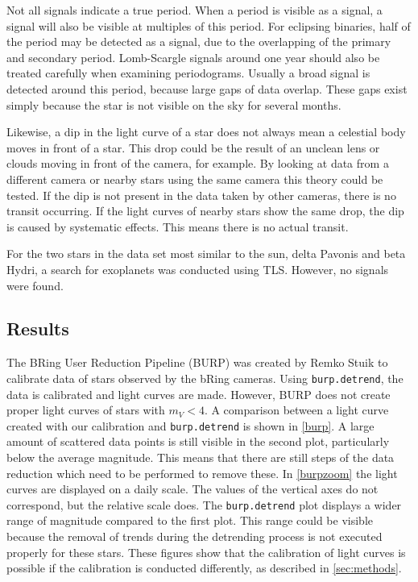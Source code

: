 \documentclass[onecolumn]{aa} %
\begin{document}
Not all signals indicate a true period.
When a period is visible as a signal, a signal will also be visible at multiples of this period. For eclipsing binaries, half of the period may be detected as a signal, due to the overlapping of the primary and secondary period.
%
Lomb-Scargle signals around one year should also be treated carefully when examining periodograms. Usually a broad signal is detected around this period, because large gaps of data overlap. These gaps exist simply because the star is not visible on the sky for several months.

Likewise, a dip in the light curve of a star does not always mean a celestial body moves in front of a star. This drop could be the result of an unclean lens or clouds moving in front of the camera, for example. By looking at data from a different camera or nearby stars using the same camera this theory could be tested. If the dip is not present in the data taken by other cameras, there is no transit occurring. If the light curves of nearby stars show the same drop, the dip is caused by systematic effects. This means there is no actual transit.

For the two stars in the data set most similar to the sun, delta Pavonis and beta Hydri, a search for exoplanets was conducted using TLS. However, no signals were found.


\subsection{Results}
The BRing User Reduction Pipeline (BURP) was created by Remko Stuik to calibrate data of stars observed by the bRing cameras. Using \texttt{burp.detrend}, the data is calibrated and light curves are made. However, BURP does not create proper light curves of stars with $m_V < 4$. A comparison between a light curve created with our calibration and \texttt{burp.detrend} is shown in \ref{burp}. A large amount of scattered data points is still visible in the second plot, particularly below the average magnitude. This means that there are still steps of the data reduction which need to be performed to remove these.
%
In \ref{burpzoom} the light curves are displayed on a daily scale. The values of the vertical axes do not correspond, but the relative scale does. The \texttt{burp.detrend} plot displays a wider range of magnitude compared to the first plot. This range could be visible because the removal of trends during the detrending process is not executed properly for these stars. These figures show that the calibration of light curves is possible if the calibration is conducted differently, as described in \ref{sec:methods}. 
\end{document}
